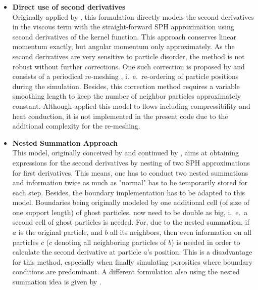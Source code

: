 \documentclass{report}
\begin{document}
\begin{itemize}
\item {\bf Direct use of second derivatives}\\
Originally applied by \cite{Flebbe1994, Watkins1996}, this formulation directly models the second derivatives in the viscous term with the straight-forward SPH approximation using second derivatives of the kernel function. This approach conserves linear momentum exactly, but angular momentum only approximately. As the second derivatives are very sensitive to particle disorder, the method is not robust without further corrections. One such correction is proposed by \cite{Chaniotis2002} and consists of a periodical re-meshing , i.\ e.\ re-ordering of particle positions during the simulation. Besides, this correction method requires a variable smoothing length to keep the number of neighbor particles approximately constant. Although \cite{Chaniotis2002} applied this model to flows including compressibility and heat conduction, it is not implemented in the present code due to the additional complexity for the re-meshing.

\item {\bf Nested Summation Approach}\\
This model, originally conceived by \cite{Flebbe1994} and continued by \cite{Speith1999}, aims at obtaining expressions for the second derivatives by nesting of two SPH approximations for first derivatives. This means, one has to conduct two nested summations and information twice as much as "normal" has to be temporarily stored for each step. Besides, the boundary implementation has to be adapted to this model. Boundaries being originally modeled by one additional cell (of size of one support length) of ghost particles, now need to be double as big, i.\ e.\ a second cell of ghost particles is needed. For, due to the nested summation, if $a$ is the original particle, and $b$ all its neighbors, then even information on all particles $c$ ($c$ denoting all neighboring particles of $b$) is needed in order to calculate the second derivative at particle $a$'s position.
This is a disadvantage for this method, especially when finally simulating porosities where boundary conditions are predominant.
A different formulation also using the nested summation idea is given by \cite{Watkins1996}.


\end{itemize}
\end{document}
